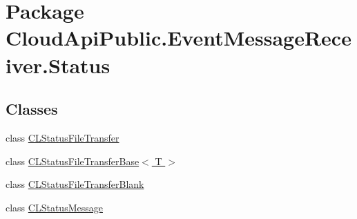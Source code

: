 \hypertarget{namespace_cloud_api_public_1_1_event_message_receiver_1_1_status}{\section{Package Cloud\-Api\-Public.\-Event\-Message\-Receiver.\-Status}
\label{namespace_cloud_api_public_1_1_event_message_receiver_1_1_status}
}
\subsection*{Classes}
\begin{DoxyCompactItemize}
\item 
class \hyperlink{class_cloud_api_public_1_1_event_message_receiver_1_1_status_1_1_c_l_status_file_transfer}{C\-L\-Status\-File\-Transfer}
\item 
class \hyperlink{class_cloud_api_public_1_1_event_message_receiver_1_1_status_1_1_c_l_status_file_transfer_base_3_01_t_01_4}{C\-L\-Status\-File\-Transfer\-Base$<$ T $>$}
\item 
class \hyperlink{class_cloud_api_public_1_1_event_message_receiver_1_1_status_1_1_c_l_status_file_transfer_blank}{C\-L\-Status\-File\-Transfer\-Blank}
\item 
class \hyperlink{class_cloud_api_public_1_1_event_message_receiver_1_1_status_1_1_c_l_status_message}{C\-L\-Status\-Message}
\end{DoxyCompactItemize}
